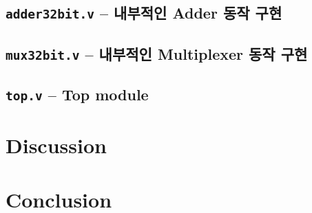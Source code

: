 \documentclass{scrartcl}
\begin{document}
\subsection{\texttt{adder32bit.v} -- 내부적인 Adder 동작 구현}

\subsection{\texttt{mux32bit.v} -- 내부적인 Multiplexer 동작 구현}

\subsection{\texttt{top.v} -- Top module}

\section{Discussion}

\section{Conclusion}
\end{document}
